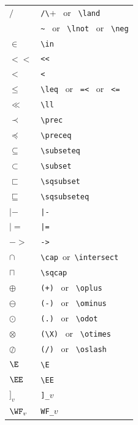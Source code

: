 \documentclass[fleqn,leqno]{article}
\begin{document}
\noindent
\begin{tabular}[t]{@{}l@{\ }l@{}}
$/\ $ & \verb+/\+ \ {\small or} \ \verb+\land+ \\
$~$ & \verb+~+ \ {\small or} \ \verb+\lnot+ \ {\small or} \ \verb+\neg+ \\
$\in$ & \verb+\in+ \\
$<<$ & \verb+<<+ \\
$<$ & \verb+<+ \\
$\leq$ & \verb+\leq+ \ {\small or} \ \verb+=<+ \ {\small or} \ \verb+<=+ \\
$\ll$ & \verb+\ll+ \\
$\prec$ & \verb+\prec+ \\
$\preceq$ & \verb+\preceq+ \\
$\subseteq$ & \verb+\subseteq+ \\
$\subset$ & \verb+\subset+ \\
$\sqsubset$ & \verb+\sqsubset+ \\
$\sqsubseteq$ & \verb+\sqsubseteq+ \\
$|-$ & \verb+|-+ \\
$|=$ & \verb+|=+ \\
$->$ & \verb+->+ \\
$\cap$ & \verb+\cap+ \,{\small or} \,\verb+\intersect+ \\
$\sqcap$ & \verb+\sqcap+ \\
$\oplus$ & \verb|(+)| \ {\small or} \ \verb+\oplus+ \\
$\ominus$ & \verb+(-)+ \ {\small or} \ \verb+\ominus+ \\
$\odot$ & \verb+(.)+ \ {\small or} \ \verb+\odot+ \\
$\otimes$ & \verb|(\X)| \ {\small or} \ \verb+\otimes+ \\
$\oslash$ & \verb+(/)+ \ {\small or} \ \verb+\oslash+ \\
$\E$ & \verb|\E| \\
$\EE$ & \verb|\EE|\\
$]_v$ & \verb|]_|$v$\\
$\WF_v$ & \verb|WF_|$v$
\end{tabular}%
\end{document}
